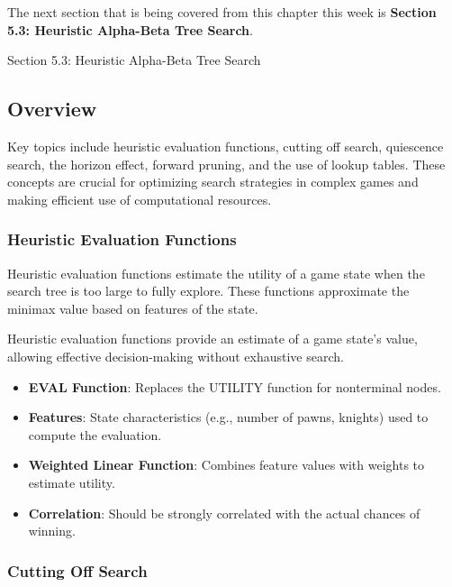The next section that is being covered from this chapter this week is \textbf{Section 5.3: Heuristic Alpha-Beta Tree Search}.

\begin{notes}{Section 5.3: Heuristic Alpha-Beta Tree Search}    
    \subsection*{Overview}
    
    Key topics include heuristic evaluation functions, cutting off search, quiescence search, the horizon effect, forward pruning, and the use of lookup tables. These concepts are crucial for optimizing 
    search strategies in complex games and making efficient use of computational resources.
    
    \subsubsection*{Heuristic Evaluation Functions}
    
    Heuristic evaluation functions estimate the utility of a game state when the search tree is too large to fully explore. These functions approximate the minimax value based on features of the state.
    
    \begin{highlight}
        Heuristic evaluation functions provide an estimate of a game state's value, allowing effective decision-making without exhaustive search.
        
        \begin{itemize}
            \item \textbf{EVAL Function}: Replaces the UTILITY function for nonterminal nodes.
            \item \textbf{Features}: State characteristics (e.g., number of pawns, knights) used to compute the evaluation.
            \item \textbf{Weighted Linear Function}: Combines feature values with weights to estimate utility.
            \item \textbf{Correlation}: Should be strongly correlated with the actual chances of winning.
        \end{itemize}
    \end{highlight}
    
    \subsubsection*{Cutting Off Search}
    

\end{notes}
